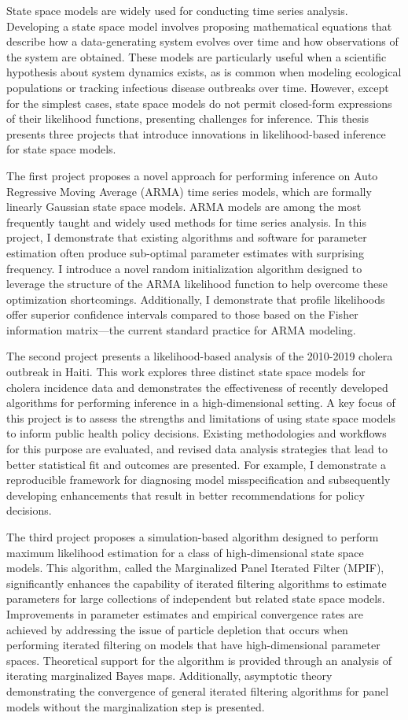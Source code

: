 State space models are widely used for conducting time series analysis.
Developing a state space model involves proposing mathematical equations that describe how a data-generating system evolves over time and how observations of the system are obtained.
These models are particularly useful when a scientific hypothesis about system dynamics exists, as is common when modeling ecological populations or tracking infectious disease outbreaks over time.
However, except for the simplest cases, state space models do not permit closed-form expressions of their likelihood functions, presenting challenges for inference.
This thesis presents three projects that introduce innovations in likelihood-based inference for state space models.

The first project proposes a novel approach for performing inference on Auto Regressive Moving Average (ARMA) time series models, which are formally linearly Gaussian state space models.
ARMA models are among the most frequently taught and widely used methods for time series analysis.
In this project, I demonstrate that existing algorithms and software for parameter estimation often produce sub-optimal parameter estimates with surprising frequency.
I introduce a novel random initialization algorithm designed to leverage the structure of the ARMA likelihood function to help overcome these optimization shortcomings.
Additionally, I demonstrate that profile likelihoods offer superior confidence intervals compared to those based on the Fisher information matrix---the current standard practice for ARMA modeling.

The second project presents a likelihood-based analysis of the 2010-2019 cholera outbreak in Haiti.
This work explores three distinct state space models for cholera incidence data and demonstrates the effectiveness of recently developed algorithms for performing inference in a high-dimensional setting.
A key focus of this project is to assess the strengths and limitations of using state space models to inform public health policy decisions.
Existing methodologies and workflows for this purpose are evaluated, and revised data analysis strategies that lead to better statistical fit and outcomes are presented.
For example, I demonstrate a reproducible framework for diagnosing model misspecification and subsequently developing enhancements that result in better recommendations for policy decisions.

The third project proposes a simulation-based algorithm designed to perform maximum likelihood estimation for a class of high-dimensional state space models.
This algorithm, called the Marginalized Panel Iterated Filter (MPIF), significantly enhances the capability of iterated filtering algorithms to estimate parameters for large collections of independent but related state space models.
Improvements in parameter estimates and empirical convergence rates are achieved by addressing the issue of particle depletion that occurs when performing iterated filtering on models that have high-dimensional parameter spaces.
Theoretical support for the algorithm is provided through an analysis of iterating marginalized Bayes maps.
Additionally, asymptotic theory demonstrating the convergence of general iterated filtering algorithms for panel models without the marginalization step is presented. 
